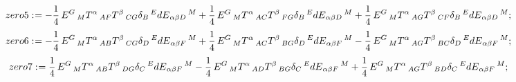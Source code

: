 \documentclass[11pt]{article}
\def\specialcolon{\mathrel{\mathop{:}}\hspace{-.5em}}
\begin{document}
\begin{dmath*}[compact, spread=2pt]
zero5\specialcolon{}=  - \frac{1}{4}\, {E}^{G}\,_{M} {T}^{\alpha}\,_{A F} {T}^{\beta}\,_{C G} {\delta}_{B}\,^{E} {dE}_{\alpha \beta D}\,^{M} + \frac{1}{4}\, {E}^{G}\,_{M} {T}^{\alpha}\,_{A C} {T}^{\beta}\,_{F G} {\delta}_{B}\,^{E} {dE}_{\alpha \beta D}\,^{M} + \frac{1}{4}\, {E}^{G}\,_{M} {T}^{\alpha}\,_{A G} {T}^{\beta}\,_{C F} {\delta}_{B}\,^{E} {dE}_{\alpha \beta D}\,^{M};
\end{dmath*}
\begin{dmath*}[compact, spread=2pt]
zero6\specialcolon{}=  - \frac{1}{4}\, {E}^{G}\,_{M} {T}^{\alpha}\,_{A B} {T}^{\beta}\,_{C G} {\delta}_{D}\,^{E} {dE}_{\alpha \beta F}\,^{M} + \frac{1}{4}\, {E}^{G}\,_{M} {T}^{\alpha}\,_{A C} {T}^{\beta}\,_{B G} {\delta}_{D}\,^{E} {dE}_{\alpha \beta F}\,^{M} - \frac{1}{4}\, {E}^{G}\,_{M} {T}^{\alpha}\,_{A G} {T}^{\beta}\,_{B C} {\delta}_{D}\,^{E} {dE}_{\alpha \beta F}\,^{M};
\end{dmath*}
\begin{dmath*}[compact, spread=2pt]
zero7\specialcolon{}= \frac{1}{4}\, {E}^{G}\,_{M} {T}^{\alpha}\,_{A B} {T}^{\beta}\,_{D G} {\delta}_{C}\,^{E} {dE}_{\alpha \beta F}\,^{M} - \frac{1}{4}\, {E}^{G}\,_{M} {T}^{\alpha}\,_{A D} {T}^{\beta}\,_{B G} {\delta}_{C}\,^{E} {dE}_{\alpha \beta F}\,^{M} + \frac{1}{4}\, {E}^{G}\,_{M} {T}^{\alpha}\,_{A G} {T}^{\beta}\,_{B D} {\delta}_{C}\,^{E} {dE}_{\alpha \beta F}\,^{M};
\end{dmath*}
\end{document}
